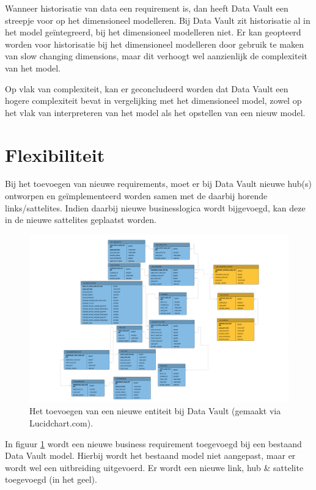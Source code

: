 Wanneer historisatie van data een requirement is, dan heeft Data Vault een streepje voor op het dimensioneel modelleren. Bij Data Vault zit historisatie al in het model geïntegreerd, bij het dimensioneel modelleren niet. Er kan geopteerd worden voor historisatie bij het dimensioneel modelleren door gebruik te maken van slow changing dimensions, maar dit verhoogt wel aanzienlijk de complexiteit van het model.

Op vlak van complexiteit, kan er geconcludeerd worden dat Data Vault een hogere complexiteit bevat in vergelijking met het dimensioneel model, zowel op het vlak van interpreteren van het model als het opstellen van een nieuw model.

\section{Flexibiliteit}
Bij het toevoegen van nieuwe requirements, moet er bij Data Vault nieuwe hub(s) ontworpen en geïmplementeerd worden samen met de daarbij horende links/sattelites. Indien daarbij nieuwe businesslogica wordt bijgevoegd, kan deze in de nieuwe sattelites geplaatst worden. 

\begin{figure}[h]
	\centering
	\includegraphics[scale=0.35]{../images/changedv.png}
	\caption{Het toevoegen van een nieuwe entiteit bij Data Vault (gemaakt via Lucidchart.com).}
	\label{fig:changedv}
\end{figure}

In figuur \ref{fig:changedv} wordt een nieuwe business requirement toegevoegd bij een bestaand Data Vault model. Hierbij wordt het bestaand model niet aangepast, maar er wordt wel een uitbreiding uitgevoerd. Er wordt een nieuwe link, hub \& sattelite toegevoegd (in het geel).

